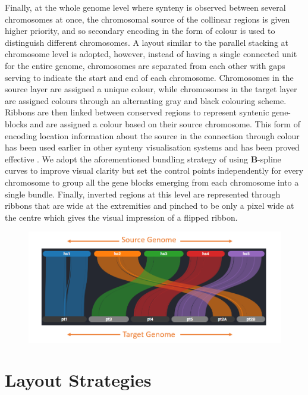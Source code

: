 Finally, at the whole genome level where synteny is observed between several chromosomes at once, the chromosomal source of the collinear regions is given higher priority, and so secondary encoding in the form of colour is used to distinguish different chromosomes. A layout similar to the parallel stacking at chromosome level is adopted, however, instead of having a single connected unit for the entire genome, chromosomes are separated from each other with gaps serving to indicate the start and end of each chromosome. Chromosomes in the source layer are assigned a unique colour, while chromosomes in the target layer are assigned colours through an alternating gray and black colouring scheme. Ribbons are then linked between conserved regions to represent syntenic gene-blocks and are assigned a colour based on their source chromosome. This form of encoding location information about the source in the connection through colour has been used earlier in other synteny visualisation systems and has been proved effective \cite{Meyer2009}. We adopt the aforementioned bundling strategy of using \textbf{B}-spline curves\cite{ref851370272} to improve visual clarity but set the control points independently for every chromosome to group all the gene blocks emerging from each chromosome into a single bundle. Finally, inverted regions at this level are represented through ribbons that are wide at the extremities and pinched to be only a pixel wide at the centre which gives the visual impression of a flipped ribbon.


\begin{figure}[ht]
  \centering
  \includegraphics[width=.75\linewidth]{images/ch_4_genome_level.PNG}
  \label{fig:ch_4_genome_level}
\end{figure}



\section{Layout Strategies}

